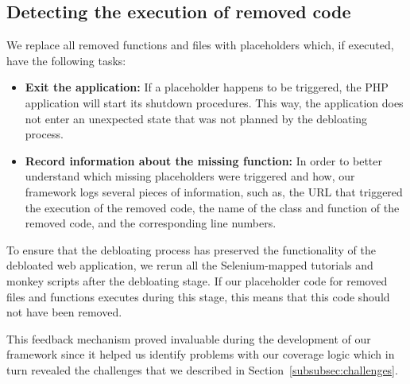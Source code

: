\subsection{Detecting the execution of removed code}
We replace all removed functions and files with placeholders which, if executed,
have the following tasks:

\begin{itemize}
  \item \textbf{Exit the application:} If a placeholder happens to be triggered,
the PHP application will start its shutdown procedures. This way, the
application does not enter an unexpected state that was not planned by the
debloating process.
  \item \textbf{Record information about the missing function:} In order
to better understand which missing placeholders were triggered and how,
our framework logs several pieces of information, such as, the URL that
triggered the execution of the removed code, the name of the class and
function of the removed code, and the
corresponding line numbers.
\end{itemize}

To ensure that the debloating process has preserved the functionality of
the debloated web application, we rerun all the Selenium-mapped tutorials and monkey scripts
after the debloating stage. If our placeholder code for removed files and
functions executes during this stage, this means that this code should not
have been removed.

This feedback mechanism proved invaluable during the development of
our framework since it helped us identify problems with our coverage
logic which in turn revealed the challenges that we described in
Section~\ref{subsubsec:challenges}.
